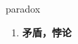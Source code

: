 
\begin{frame}
{\huge paradox}
\begin{center}
\begin{enumerate}\Large
  \item \textbf{矛盾，悖论}
\end{enumerate}
\end{center}
\end{frame}
